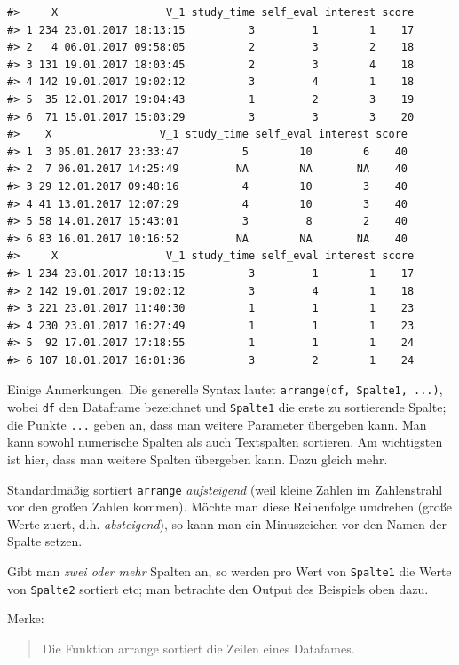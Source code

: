 \documentclass[12pt,ngerman,]{book}
\begin{document}
\begin{verbatim}
#>     X                 V_1 study_time self_eval interest score
#> 1 234 23.01.2017 18:13:15          3         1        1    17
#> 2   4 06.01.2017 09:58:05          2         3        2    18
#> 3 131 19.01.2017 18:03:45          2         3        4    18
#> 4 142 19.01.2017 19:02:12          3         4        1    18
#> 5  35 12.01.2017 19:04:43          1         2        3    19
#> 6  71 15.01.2017 15:03:29          3         3        3    20
#>    X                 V_1 study_time self_eval interest score
#> 1  3 05.01.2017 23:33:47          5        10        6    40
#> 2  7 06.01.2017 14:25:49         NA        NA       NA    40
#> 3 29 12.01.2017 09:48:16          4        10        3    40
#> 4 41 13.01.2017 12:07:29          4        10        3    40
#> 5 58 14.01.2017 15:43:01          3         8        2    40
#> 6 83 16.01.2017 10:16:52         NA        NA       NA    40
#>     X                 V_1 study_time self_eval interest score
#> 1 234 23.01.2017 18:13:15          3         1        1    17
#> 2 142 19.01.2017 19:02:12          3         4        1    18
#> 3 221 23.01.2017 11:40:30          1         1        1    23
#> 4 230 23.01.2017 16:27:49          1         1        1    23
#> 5  92 17.01.2017 17:18:55          1         1        1    24
#> 6 107 18.01.2017 16:01:36          3         2        1    24
\end{verbatim}

Einige Anmerkungen. Die generelle Syntax lautet
\texttt{arrange(df,\ Spalte1,\ ...)}, wobei \texttt{df} den Dataframe
bezeichnet und \texttt{Spalte1} die erste zu sortierende Spalte; die
Punkte \texttt{...} geben an, dass man weitere Parameter übergeben kann.
Man kann sowohl numerische Spalten als auch Textspalten sortieren. Am
wichtigsten ist hier, dass man weitere Spalten übergeben kann. Dazu
gleich mehr.

Standardmäßig sortiert \texttt{arrange} \emph{aufsteigend} (weil kleine
Zahlen im Zahlenstrahl vor den großen Zahlen kommen). Möchte man diese
Reihenfolge umdrehen (große Werte zuert, d.h. \emph{absteigend}), so
kann man ein Minuszeichen vor den Namen der Spalte setzen.

Gibt man \emph{zwei oder mehr} Spalten an, so werden pro Wert von
\texttt{Spalte1} die Werte von \texttt{Spalte2} sortiert etc; man
betrachte den Output des Beispiels oben dazu.

Merke:

\begin{quote}
Die Funktion arrange sortiert die Zeilen eines Datafames.
\end{quote}
\end{document}
